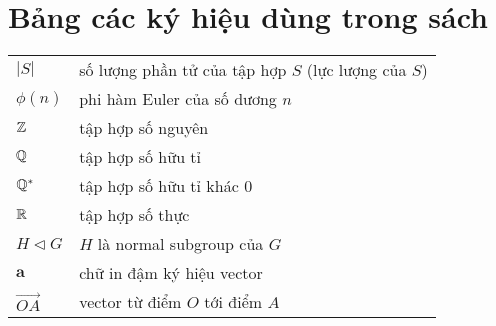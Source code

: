 \section*{Bảng các ký hiệu dùng trong sách}

\begin{table}[h]
    \begin{tabular}{l l}
        $|S|$ & số lượng phần tử của tập hợp $S$ (lực lượng của $S$) \\
        $\phi(n)$ & phi hàm Euler của số dương $n$ \\
        $\mathbb{Z}$ & tập hợp số nguyên \\
        $\mathbb{Q}$ & tập hợp số hữu tỉ \\
        $\mathbb{Q}^*$ & tập hợp số hữu tỉ khác 0 \\
        $\mathbb{R}$ & tập hợp số thực \\
        $H \triangleleft G$ & $H$ là normal subgroup của $G$ \\
        $\bm{a}$ & chữ in đậm ký hiệu vector \\
        $\overrightarrow{OA}$ & vector từ điểm $O$ tới điểm $A$
    \end{tabular}
\end{table}

\newpage
